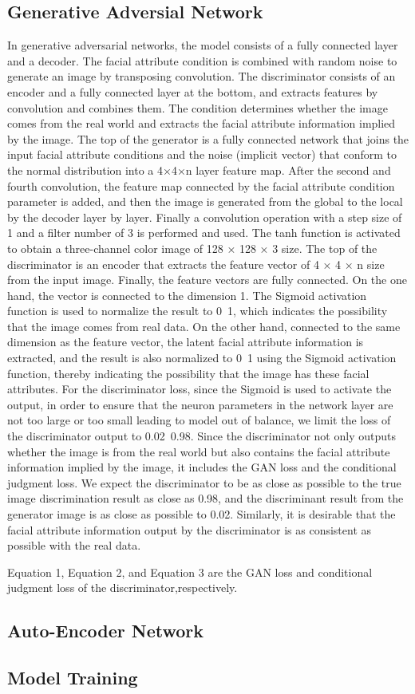 \subsection{Generative Adversial Network}
In generative adversarial networks, the model consists of a fully connected layer and a decoder. The facial attribute condition is combined with random noise to generate an image by transposing convolution. The discriminator consists of an encoder and a fully connected layer at the bottom, and extracts features by convolution and combines them. The condition determines whether the image comes from the real world and extracts the facial attribute information implied by the image.
The top of the generator is a fully connected network that joins the input facial attribute conditions and the noise (implicit vector) that conform to the normal distribution into a 4×4×n layer feature map. 
After the second and fourth convolution, the feature map connected by the facial attribute condition parameter is added, and then the image is generated from the global to the local by the decoder layer by layer. Finally a convolution operation with a step size of 1 and a filter number of 3 is performed and used. The tanh function is activated to obtain a three-channel color image of 128 × 128 × 3 size.
The top of the discriminator is an encoder that extracts the feature vector of 4 × 4 × n size from the input image. Finally, the feature vectors are fully connected. On the one hand, the vector is connected to the dimension 1. The Sigmoid activation function is used to normalize the result to 0~1, which indicates the possibility that the image comes from real data. 
On the other hand, connected to the same dimension as the feature vector, the latent facial attribute information is extracted, and the result is also normalized to 0~1 using the Sigmoid activation function, thereby indicating the possibility that the image has these facial attributes.
For the discriminator loss, since the Sigmoid is used to activate the output, in order to ensure that the neuron parameters in the network layer are not too large or too small leading to model out of balance, we limit the loss of the discriminator output to 0.02~0.98. Since the discriminator not only outputs whether the image is from the real world but also contains the facial attribute information implied by the image, it includes the GAN loss and the conditional judgment loss. We expect the discriminator to be as close as possible to the true image discrimination result as close as 0.98, and the discriminant result from the generator image is as close as possible to 0.02. Similarly, it is desirable that the facial attribute information output by the discriminator is as consistent as possible with the real data. 

Equation 1, Equation 2, and Equation 3 are the GAN loss and conditional judgment loss of the discriminator,respectively.
\subsection{Auto-Encoder Network}
\subsection{Model Training}